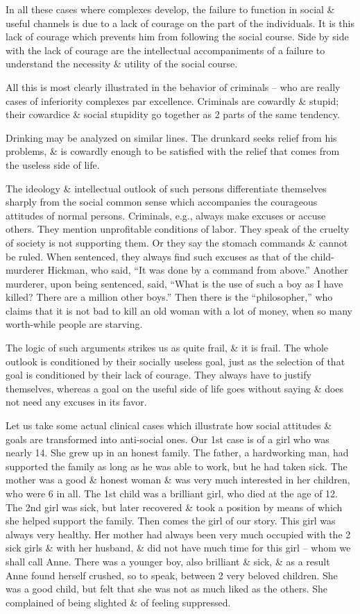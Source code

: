 \documentclass{article}
\begin{document}
In all these cases where complexes develop, the failure to function in social \& useful channels is due to a lack of courage on the part of the individuals. It is this lack of courage which prevents him from following the social course. Side by side with the lack of courage are the intellectual accompaniments of a failure to understand the necessity \& utility of the social course.

All this is most clearly illustrated in the behavior of criminals -- who are really cases of inferiority complexes par excellence. Criminals are cowardly \& stupid; their cowardice \& social stupidity go together as 2 parts of the same tendency.

Drinking may be analyzed on similar lines. The drunkard seeks relief from his problems, \& is cowardly enough to be satisfied with the relief that comes from the useless side of life.

The ideology \& intellectual outlook of such persons differentiate themselves sharply from the social common sense which accompanies the courageous attitudes of normal persons. Criminals, e.g., always make excuses or accuse others. They mention unprofitable conditions of labor. They speak of the cruelty of society is not supporting them. Or they say the stomach commands \& cannot be ruled. When sentenced, they always find such excuses as that of the child-murderer Hickman, who said, ``It was done by a command from above.'' Another murderer, upon being sentenced, said, ``What is the use of such a boy as I have killed? There are a million other boys.'' Then there is the ``philosopher,'' who claims that it is not bad to kill an old woman with a lot of money, when so many worth-while people are starving.

The logic of such arguments strikes us as quite frail, \& it is frail. The whole outlook is conditioned by their socially useless goal, just as the selection of that goal is conditioned by their lack of courage. They always have to justify themselves, whereas a goal on the useful side of life goes without saying \& does not need any excuses in its favor.

Let us take some actual clinical cases which illustrate how social attitudes \& goals are transformed into anti-social ones. Our 1st case is of a girl who was nearly 14. She grew up in an honest family. The father, a hardworking man, had supported the family as long as he was able to work, but he had taken sick. The mother was a good \& honest woman \& was very much interested in her children, who were 6 in all. The 1st child was a brilliant girl, who died at the age of 12. The 2nd girl was sick, but later recovered \& took a position by means of which she helped support the family. Then comes the girl of our story. This girl was always very healthy. Her mother had always been very much occupied with the 2 sick girls \& with her husband, \& did not have much time for this girl -- whom we shall call Anne. There was a younger boy, also brilliant \& sick, \& as a result Anne found herself crushed, so to speak, between 2 very beloved children. She was a good child, but felt that she was not as much liked as the others. She complained of being slighted \& of feeling suppressed.
\end{document}
